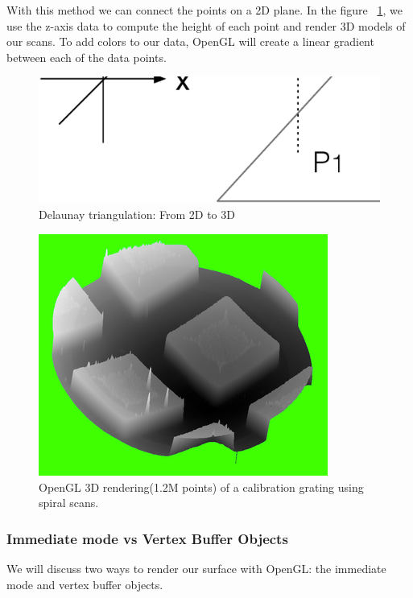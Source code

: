 With this method we can connect the points on a 2D plane. In the figure  ~\ref{triangulation3d}, we use the z-axis data to compute the height of each point and render 3D models of our scans. To add colors to our data, OpenGL will create a linear gradient between each of the data points.

\begin{figure}[!ht]
  \centering
  \includegraphics[scale=0.2]{images/delaunay.eps}
    \caption{Delaunay triangulation: From 2D to 3D}
  \label{triangulation3d}
\end{figure}

\begin{figure}[!ht]
  \centering
  \includegraphics[scale=0.8]{images/3drendering.png}
    \caption{OpenGL 3D rendering(1.2M points) of a calibration grating using spiral scans.}
  \label{rendering3d}
\end{figure}

\subsubsection{Immediate mode vs Vertex Buffer Objects}

We will discuss two ways to render our surface with OpenGL: the immediate mode and vertex buffer objects.

